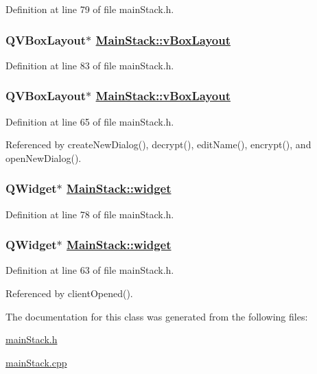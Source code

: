 Definition at line 79 of file main\-Stack.h.\hypertarget{classMainStack_r24}{
\subsubsection[vBoxLayout]{\setlength{\rightskip}{0pt plus 5cm}QVBox\-Layout$\ast$ \hyperlink{classMainStack_r8}{Main\-Stack::v\-Box\-Layout}}}
\label{classMainStack_r24}


Definition at line 83 of file main\-Stack.h.\hypertarget{classMainStack_r8}{
\subsubsection[vBoxLayout]{\setlength{\rightskip}{0pt plus 5cm}QVBox\-Layout$\ast$ \hyperlink{classMainStack_r8}{Main\-Stack::v\-Box\-Layout}}}
\label{classMainStack_r8}


Definition at line 65 of file main\-Stack.h.

Referenced by create\-New\-Dialog(), decrypt(), edit\-Name(), encrypt(), and open\-New\-Dialog().\hypertarget{classMainStack_r19}{
\subsubsection[widget]{\setlength{\rightskip}{0pt plus 5cm}QWidget$\ast$ \hyperlink{classMainStack_r6}{Main\-Stack::widget}}}
\label{classMainStack_r19}


Definition at line 78 of file main\-Stack.h.\hypertarget{classMainStack_r6}{
\subsubsection[widget]{\setlength{\rightskip}{0pt plus 5cm}QWidget$\ast$ \hyperlink{classMainStack_r6}{Main\-Stack::widget}}}
\label{classMainStack_r6}


Definition at line 63 of file main\-Stack.h.

Referenced by client\-Opened().

The documentation for this class was generated from the following files:\begin{CompactItemize}
\item 
\hyperlink{mainStack_8h}{main\-Stack.h}\item 
\hyperlink{mainStack_8cpp}{main\-Stack.cpp}\end{CompactItemize}
